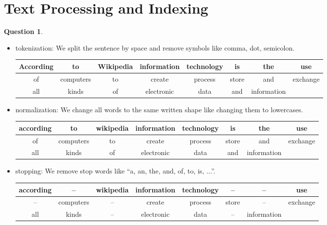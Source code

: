 \documentclass[11pt,a4paper,reqno]{amsart}
\theoremstyle{definition}
\theoremstyle{notation}
\newtheorem{question}[theorem]{Question}
\begin{document}

\section{Text Processing and Indexing}


\begin{question}%
\end{question}
\begin{itemize}
\item tokenization: We split the sentence by space and remove symbols like comma, dot, semicolon.
\begin{table}[h]
\begin{tabular}{|c|c|c|c|c|c|c|c|}
\hline
According & to & Wikipedia & information & technology & is & the & use 
\\ \hline 
of & computers & to & create & process & store & and & exchange
\\ \hline 
all & kinds & of & electronic & data & and & information &
\\ \hline
\end{tabular}
\end{table}



\item normalization: We change all words to the same written shape like changing them to lowercases.  
\begin{table}[h]
\begin{tabular}{|c|c|c|c|c|c|c|c|}
\hline
according & to & wikipedia & information & technology & is & the & use 
\\ \hline 
of & computers & to & create & process & store & and & exchange
\\ \hline 
all & kinds & of & electronic & data & and & information &
\\ \hline
\end{tabular}
\end{table}



\item stopping: We remove stop words like ``a, an, the, and, of, to, is, ...''. 
\begin{table}[h]
\begin{tabular}{|c|c|c|c|c|c|c|c|}
\hline
according & -- & wikipedia & information & technology & -- & -- & use  \\ \hline
-- & computers & -- & create & process & store & -- & exchange \\ \hline
 all & kinds & -- & electronic & data & -- & information & \\ \hline
\end{tabular}
\end{table}




\end{itemize}
\end{document}

